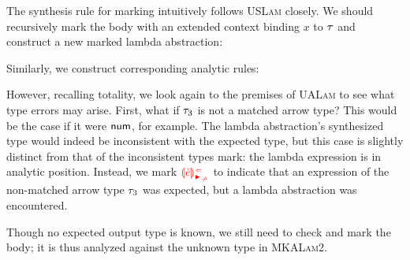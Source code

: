 The synthesis rule for marking intuitively follows \textsc{USLam} closely. We should recursively
mark the body with an extended context binding $x$ to $\TMV$ and construct a new marked lambda
abstraction:
%
\begin{mathpar}

\end{mathpar}
%
Similarly, we construct corresponding analytic rules:
%
\begin{mathpar}

\end{mathpar}
%
However, recalling totality, we look again to the premises of \textsc{UALam} to see what type errors
may arise. First, what if $\TMV_3$ is not a matched arrow type? This would be the case if it were
$\TNum$, for example. The lambda abstraction's synthesized type would indeed be inconsistent with
the expected type, but this case is slightly distinct from that of the inconsistent types mark: the
lambda expression is in analytic position. Instead, we mark $\ECAnaNonMatchedArrow{\ECMV}$ to
indicate that an expression of the non-matched arrow type $\TMV_3$ was expected, but a lambda
abstraction was encountered.
%
\begin{mathpar}

\end{mathpar}
%
Though no expected output type is known, we still need to check and mark the body; it is thus
analyzed against the unknown type in \textsc{MKALam2}.

